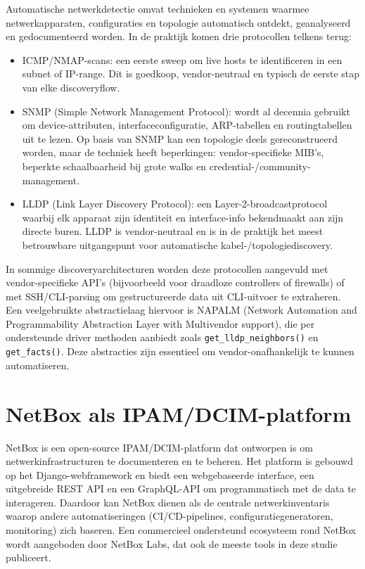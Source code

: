 Automatische netwerkdetectie omvat technieken en systemen waarmee netwerkapparaten, configuraties en topologie automatisch ontdekt, geanalyseerd en gedocumenteerd worden. In de praktijk komen drie protocollen telkens terug:

\begin{itemize}
  \item ICMP/NMAP-scans: een eerste sweep om live hosts te identificeren in een subnet of IP-range. Dit is goedkoop, vendor-neutraal en typisch de eerste stap van elke discoveryflow.
  \item SNMP (Simple Network Management Protocol): wordt al decennia gebruikt om device-attributen, interfaceconfiguratie, ARP-tabellen en routingtabellen uit te lezen. Op basis van SNMP kan een topologie deels gereconstrueerd worden, maar de techniek heeft beperkingen: vendor-specifieke MIB's, beperkte schaalbaarheid bij grote walks en credential-/community-management\autocite{SnmpTopologyDiscoveryIEEE2013}.
  \item LLDP (Link Layer Discovery Protocol): een Layer-2-broadcastprotocol waarbij elk apparaat zijn identiteit en interface-info bekendmaakt aan zijn directe buren. LLDP is vendor-neutraal en is in de praktijk het meest betrouwbare uitgangspunt voor automatische kabel-/topologiediscovery\autocite{LLDP_IJCA}.
\end{itemize}

In sommige discoveryarchitecturen worden deze protocollen aangevuld met vendor-specifieke API's (bijvoorbeeld voor draadloze controllers of firewalls) of met SSH/CLI-parsing om gestructureerde data uit CLI-uitvoer te extraheren. Een veelgebruikte abstractielaag hiervoor is NAPALM (Network Automation and Programmability Abstraction Layer with Multivendor support), die per ondersteunde driver methoden aanbiedt zoals \texttt{get\_lldp\_neighbors()} en \texttt{get\_facts()}\autocite{NAPALM}. Deze abstracties zijn essentieel om vendor-onafhankelijk te kunnen automatiseren.

\section{NetBox als IPAM/DCIM-platform}
\label{sec:netbox-platform}

NetBox is een open-source IPAM/DCIM-platform dat ontworpen is om netwerkinfrastructuren te documenteren en te beheren\autocite{NetBoxOSS,NetBoxDiscoveryDocs}. Het platform is gebouwd op het Django-webframework en biedt een webgebaseerde interface, een uitgebreide REST API en een GraphQL-API om programmatisch met de data te interageren. Daardoor kan NetBox dienen als de centrale netwerkinventaris waarop andere automatiseringen (CI/CD-pipelines, configuratiegeneratoren, monitoring) zich baseren. Een commercieel ondersteund ecosysteem rond NetBox wordt aangeboden door NetBox Labs, dat ook de meeste tools in deze studie publiceert\autocite{NetBoxLabsAbout}.


